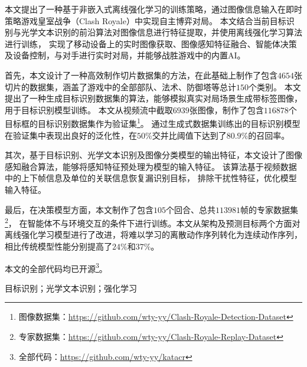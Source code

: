 
\clearpage
\titlespacing{\chapter}{0pt}{0mm}{5mm}

本文提出了一种基于非嵌入式离线强化学习的训练策略，通过图像信息输入在即时策略游戏皇室战争（Clash Royale）中实现自主博弈对局。
本文结合当前目标识别与光学文本识别的前沿算法对图像信息进行特征提取，并使用离线强化学习算法进行训练，
实现了移动设备上的实时图像获取、图像感知特征融合、智能体决策及设备控制，与对手进行实时对局，并能够战胜游戏中的内置AI。

首先，本文设计了一种高效制作切片数据集的方法，在此基础上制作了包含$4654$张切片的数据集，涵盖了游戏中的全部部队、法术、防御塔等总计$150$个类别。
本文提出了一种生成目标识别数据集的算法，能够模拟真实对局场景生成带标签图像，用于目标识别模型训练。
本文从视频流中截取$6939$张图像，制作了包含$116878$个目标框的目标识别数据集作为验证集\footnote{图像数据集：\url{https://github.com/wty-yy/Clash-Royale-Detection-Dataset}\hfill}。
通过生成式数据集训练出的目标识别模型在验证集中表现出良好的泛化性，在$50\%$交并比阈值下达到了$80.9\%$的召回率。

其次，基于目标识别、光学文本识别及图像分类模型的输出特征，本文设计了图像感知融合算法，能够将感知特征预处理为模型的输入特征。
该算法基于视频数据中的上下帧信息及单位的关联信息恢复漏识别目标，
排除干扰性特征，优化模型输入特征。

最后，在决策模型方面，本文制作了包含$105$个回合、总共$113981$帧的专家数据集\footnote{专家数据集：\url{https://github.com/wty-yy/Clash-Royale-Replay-Dataset}\hfill}，
在智能体不与环境交互的条件下进行训练。本文从架构及预测目标两个方面对离线强化学习模型进行了改进，将难以学习的离散动作序列转化为连续动作序列，
相比传统模型性能分别提高了$24\%$和$37\%$。

本文的全部代码均已开源\footnote{全部代码：\url{https://github.com/wty-yy/katacr}}。

\vspace{\baselineskip}
 目标识别；光学文本识别；强化学习

